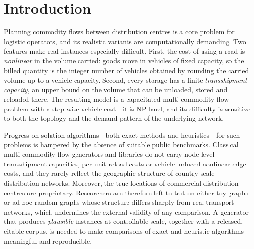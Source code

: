 \documentclass[runningheads]{llncs}
\begin{document}
\section{Introduction}
\label{sec:intro}

Planning commodity flows between distribution centres is a core problem for
logistic operators, and its realistic variants are computationally demanding.
Two features make real instances especially difficult. First, the cost of using
a road is \emph{nonlinear} in the volume carried: goods move in vehicles of
fixed capacity, so the billed quantity is the integer number of vehicles
obtained by rounding the carried volume up to a vehicle capacity. Second, every
storage has a finite \emph{transshipment capacity}, an upper bound on the volume
that can be unloaded, stored and reloaded there. The resulting model is a
capacitated multi-commodity flow problem with a step-wise vehicle cost---it is
NP-hard, and its difficulty is sensitive to both the topology and the demand
pattern of the underlying network.

Progress on solution algorithms---both exact methods and heuristics---for such
problems is hampered by the absence of suitable public benchmarks. Classical multi-commodity flow generators and libraries do
not carry node-level transshipment capacities, per-unit reload costs or
vehicle-induced nonlinear edge costs, and they rarely reflect the geographic
structure of country-scale distribution networks. Moreover, the true locations
of commercial distribution centres are proprietary. Researchers are therefore
left to test on either toy graphs or ad-hoc random graphs whose structure
differs sharply from real transport networks, which undermines the external
validity of any comparison. A generator that produces \emph{plausible} instances
at controllable scale, together with a released, citable corpus, is needed to
make comparisons of exact and heuristic algorithms meaningful and reproducible.
\end{document}
